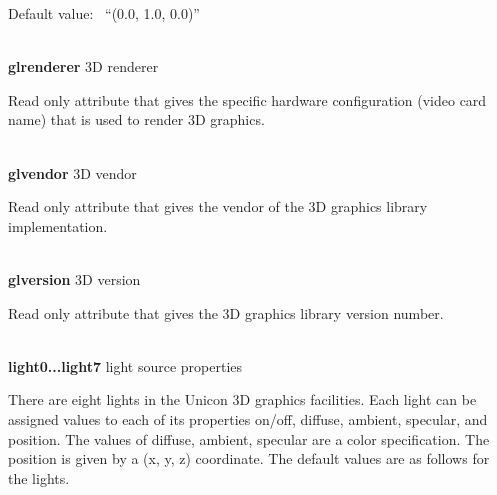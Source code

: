 \documentclass[letterpaper]{article}
\begin{document}
\bigskip

{
Default value: \ \textsf{{}``(0.0, 1.0, 0.0)''}}

\noindent\hrulefill\\
\noindent\textsf{\textbf{glrenderer}} \hfill 3D renderer


\bigskip

{
Read only attribute that gives the specific hardware configuration (video card name) that is used to render 3D
graphics.}

\noindent\hrulefill\\
\noindent\textsf{\textbf{glvendor}} \hfill 3D vendor


\bigskip

{
Read only attribute that gives the vendor of the 3D graphics library implementation.}

\noindent\hrulefill\\
\noindent\textsf{\textbf{glversion}} \hfill 3D version


\bigskip

{
Read only attribute that gives the 3D graphics library version number.}


\bigskip

\noindent\hrulefill\\
\noindent\textsf{\textbf{light0...light7}} \hfill light source properties


\bigskip

{
There are eight lights in the Unicon 3D graphics facilities. Each light can be assigned values to each of its properties
on/off, diffuse, ambient, specular, and position. The values of diffuse, ambient, specular are a color specification.
The position is given by a (x, y, z) coordinate. The default values are as follows for the lights.}


\bigskip


\bigskip
\end{document}
